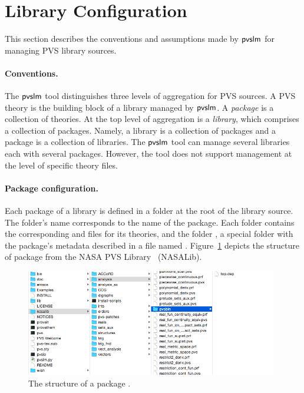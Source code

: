 \section{Library Configuration}
\label{sec.conf}

This section describes the conventions and assumptions made by
$\textsf{pvslm}$ for managing PVS library sources.

\paragraph{Conventions.}
The $\textsf{pvslm}$ tool distinguishes three levels of aggregation for PVS
sources. A PVS theory is the building block of a library managed by
$\textsf{pvslm}$. A {\em package} is a collection of theories. At the top
level of aggregation is a {\em library}, which comprises a collection
of packages. Namely, a library is a collection of packages and a
package is a collection of libraries. The $\textsf{pvslm}$ tool can manage
several libraries each with several packages. However, the tool does
not support management at the level of specific theory files.

\paragraph{Package configuration.}
Each package of a library is defined in a folder at the root of the
library source. The folder's name corresponds to the name of the
package. Each folder contains the corresponding  and
 files for its theories, and the folder , a
special folder with the package's metadata described in a file named
. Figure~\ref{fig.package} depicts the structure of
package  from the NASA PVS Library~\cite{nasalib}
(NASALib).

\begin{figure}
  \centering
  \includegraphics[width=11cm]{images/package.png}
  \caption{The structure of a package .}
  \label{fig.package}
\end{figure}

